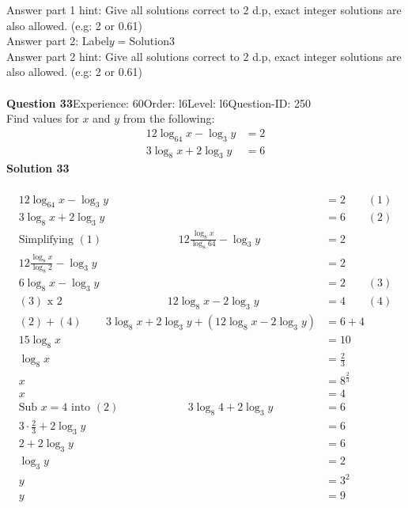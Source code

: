 \documentclass{article}
\begin{document}
Answer part 1 hint: \hspace{15pt}Give all solutions correct to 2 d.p, exact integer solutions are also allowed. (e.g: 2 or 0.61)\\
Answer part 2: \hspace{10pt}Label\hspace{10pt}$y=$\hspace{10pt}Solution\hspace{10pt}3\\
Answer part 2 hint: \hspace{15pt}Give all solutions correct to 2 d.p, exact integer solutions are also allowed. (e.g: 2 or 0.61)\\
\\[4pt]
\noindent\textbf{Question 33}\hspace{20pt}Experience: 60\hspace{20pt}Order: l6\hspace{20pt}Level: l6\hspace{20pt}Question-ID: 250\\[2pt]
Find values for $x$ and $y$ from the following:
\begin{align*}
12\log_{64}x-\log_{3}y&=2\\[2pt]
3\log_{8}x+2\log_{3}y&=6
\end{align*}
\noindent\textbf{Solution 33}\\[2pt]
\\[-35pt]\begin{align*}
12\log_{64}x-\log_{3}y&=2\qquad (1)\\[2pt]
3\log_{8}x+2\log_{3}y&=6\qquad (2)\\[2pt]
\text{Simplifying}\,\,(1)\hspace{83pt}12\displaystyle\frac{\log_{8}x}{\log_{8}64}-\log_{3}y&=2\\[2pt]
12\displaystyle\frac{\log_{8}x}{\log_{8}2}-\log_{3}y&=2\\[2pt]
6\log_{8}x-\log_{3}y&=2\qquad(3)\\[2pt]
(3)\,\,\text{x}\,\,2\hspace{114pt} 12\log_{8}x-2\log_{3}y&=4\qquad (4)\\[2pt]
(2)+(4)\hspace{26pt}3\log_{8}x+2\log_{3}y+(12\log_{8}x-2\log_{3}y)&=6+4\\[2pt]
15\log_{8}x&=10\\[2pt]
\log_{8}x&=\displaystyle\frac{2}{3}\\[2pt]
x&=8^{\frac{2}{3}}\\[2pt]
x&=4\\[12pt]
\text{Sub}\,\,x=4\,\,\text{into}\,\,(2)\hspace{75pt}3\log_{8}4+2\log_{3}y&=6\\[2pt]
3\!\cdot\!\frac{2}{3}+2\log_{3}y&=6\\[2pt]
2+2\log_{3}y&=6\\[2pt]
\log_{3}y&=2\\[2pt]
y&=3^2\\[2pt]
y&=9
\end{align*}
\end{document}
